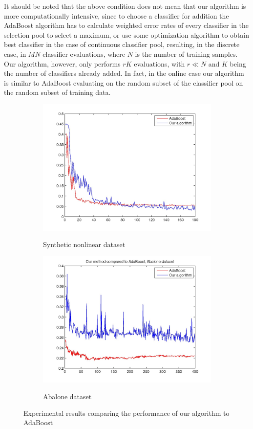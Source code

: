 It should be noted that the above condition does not mean that our algorithm is more computationally intensive, since to choose a classifier for addition the AdaBoost algorithm has to calculate weighted error rates of every classifier in the selection pool to select a maximum, or use some optimization algorithm to obtain best classifier in the case of continuous classifier pool, resulting, in the discrete case, in $MN$ classifier evaluations, where $N$ is the number of training samples. Our algorithm, however, only performs $rK$ evaluations,  with $r \ll N$ and $K$ being the number of classifiers already added.  In fact,  in the online case our algorithm is similar to AdaBoost evaluating on the random subset of the classifier pool on the random subset of training data. 
\begin{figure}[t]
    \centering
\begin{subfigure}[b]{.45\linewidth}
       \includegraphics[width=0.9\linewidth]{adas}
\label{noref1}
        \caption{Synthetic nonlinear dataset}
      \end{subfigure}%
\hspace{.01\linewidth}
\begin{subfigure}[b]{.45\linewidth}
	 \includegraphics[width=0.9\linewidth]{adaab}
       \label{noref2}
      \caption{Abalone dataset}
  
	 \end{subfigure}%

    \caption{Experimental results comparing the performance of our algorithm to AdaBoost}
    \label{adacom}
\end{figure}
